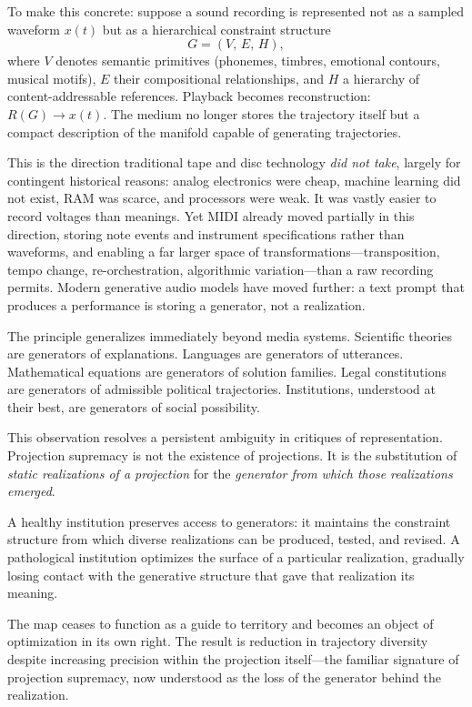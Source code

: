 \documentclass[12pt, a4paper]{article}
\theoremstyle{plain}
\theoremstyle{definition}
\theoremstyle{remark}
\begin{document}
To make this concrete: suppose a sound recording is represented not as a sampled
waveform $x(t)$ but as a hierarchical constraint structure
\[
G = (V,\, E,\, H),
\]
where $V$ denotes semantic primitives (phonemes, timbres, emotional contours,
musical motifs), $E$ their compositional relationships, and $H$ a hierarchy of
content-addressable references.
Playback becomes reconstruction: $R(G) \to x(t)$.
The medium no longer stores the trajectory itself but a compact description of the
manifold capable of generating trajectories.

This is the direction traditional tape and disc technology \emph{did not take},
largely for contingent historical reasons: analog electronics were cheap,
machine learning did not exist, RAM was scarce, and processors were weak.
It was vastly easier to record voltages than meanings.
Yet MIDI already moved partially in this direction, storing note events and
instrument specifications rather than waveforms, and enabling a far larger space
of transformations---transposition, tempo change, re-orchestration, algorithmic
variation---than a raw recording permits.
Modern generative audio models have moved further: a text prompt that produces
a performance is storing a generator, not a realization.

The principle generalizes immediately beyond media systems.
Scientific theories are generators of explanations.
Languages are generators of utterances.
Mathematical equations are generators of solution families.
Legal constitutions are generators of admissible political trajectories.
Institutions, understood at their best, are generators of social possibility.

This observation resolves a persistent ambiguity in critiques of representation.
Projection supremacy is not the existence of projections.
It is the substitution of \emph{static realizations of a projection} for the
\emph{generator from which those realizations emerged}.

A healthy institution preserves access to generators: it maintains the constraint
structure from which diverse realizations can be produced, tested, and revised.
A pathological institution optimizes the surface of a particular realization,
gradually losing contact with the generative structure that gave that realization
its meaning.

The map ceases to function as a guide to territory and becomes an object of
optimization in its own right.
The result is reduction in trajectory diversity despite increasing precision
within the projection itself---the familiar signature of projection supremacy,
now understood as the loss of the generator behind the realization.
\end{document}
